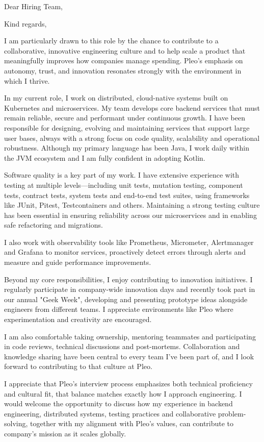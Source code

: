\documentclass[11pt,a4paper,sans]{moderncv}
\begin{document}
\date{November 29, 2025}
\subject{Senior Backend Engineer}
\opening{Dear Hiring Team,}
\closing{Kind regards,}

\makelettertitle

\begin{justify}
I am particularly drawn to this role by the chance to contribute to a collaborative, innovative engineering culture and to help scale a product that meaningfully improves how companies manage spending. Pleo's emphasis on autonomy, trust, and innovation resonates strongly with the environment in which I thrive.

In my current role, I work on distributed, cloud-native systems built on Kubernetes and microservices. My team develops core backend services that must remain reliable, secure and performant under continuous growth. I have been responsible for designing, evolving and maintaining services that support large user bases, always with a strong focus on code quality, scalability and operational robustness. Although my primary language has been Java, I work daily within the JVM ecosystem and I am fully confident in adopting Kotlin.

Software quality is a key part of my work. I have extensive experience with testing at multiple levels—including unit tests, mutation testing, component tests, contract tests, system tests and end-to-end test suites, using frameworks like JUnit, Pitest, Testcontainers and others. Maintaining a strong testing culture has been essential in ensuring reliability across our microservices and in enabling safe refactoring and migrations.

I also work with observability tools like Prometheus, Micrometer, Alertmanager and Grafana to monitor services, proactively detect errors through alerts and measure and guide performance improvements.

Beyond my core responsibilities, I enjoy contributing to innovation initiatives. I regularly participate in company-wide innovation days and recently took part in our annual "Geek Week", developing and presenting prototype ideas alongside engineers from different teams. I appreciate environments like Pleo where experimentation and creativity are encouraged.

I am also comfortable taking ownership, mentoring teammates and participating in code reviews, technical discussions and post-mortems. Collaboration and knowledge sharing have been central to every team I've been part of, and I look forward to contributing to that culture at Pleo.

I appreciate that Pleo's interview process emphasizes both technical proficiency and cultural fit, that balance matches exactly how I approach engineering. I would welcome the opportunity to discuss how my experience in backend engineering, distributed systems, testing practices and collaborative problem-solving, together with my alignment with Pleo's values, can contribute to company's mission as it scales globally.
\end{justify}

\makeletterclosing
\end{document}
